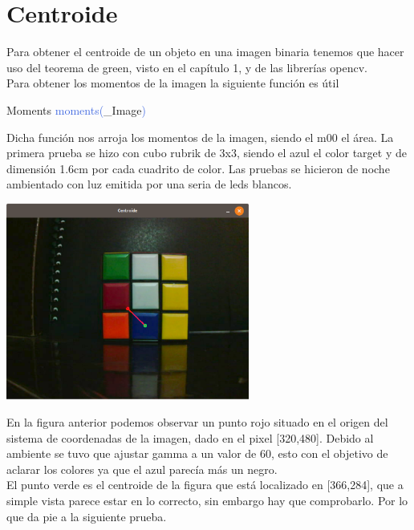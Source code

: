 \section{Centroide}
Para obtener el centroide de un objeto en una imagen binaria tenemos que hacer uso del
teorema de green, visto en el capítulo 1, y de las librerías opencv.\\
Para obtener los momentos de la imagen la siguiente función es útil
\begin{example}[label={ex:serie}]{Moments}
	\textcolor{RoyalBlue}{moments(}\textcolor{Bittersweet}{\_Image}\textcolor{RoyalBlue}{)}
\end{example}
Dicha función nos arroja los momentos de la imagen, siendo el m00 el área. La primera
prueba se hizo con cubo rubrik de 3x3, siendo el azul el color target y de dimensión
1.6cm por cada cuadrito de color. Las pruebas se hicieron de noche ambientado con luz
emitida por una seria de leds blancos.
\begin{center}
	\includegraphics[width=0.6\textwidth]{Contenido/Cuerpo/Capitulo4/Fig18.eps}
	\label{Fig9}
\end{center}
En la figura anterior podemos observar un punto rojo situado en el origen del sistema
de coordenadas de la imagen, dado en el pixel [320,480]. Debido al ambiente se tuvo
que ajustar gamma a un valor de 60, esto con el objetivo de aclarar los colores
ya que el azul parecía más un negro.\\
El punto verde es el centroide de la figura que está localizado en [366,284], que
a simple vista parece estar en lo correcto, sin embargo hay que comprobarlo. Por lo
que da pie a la siguiente prueba.